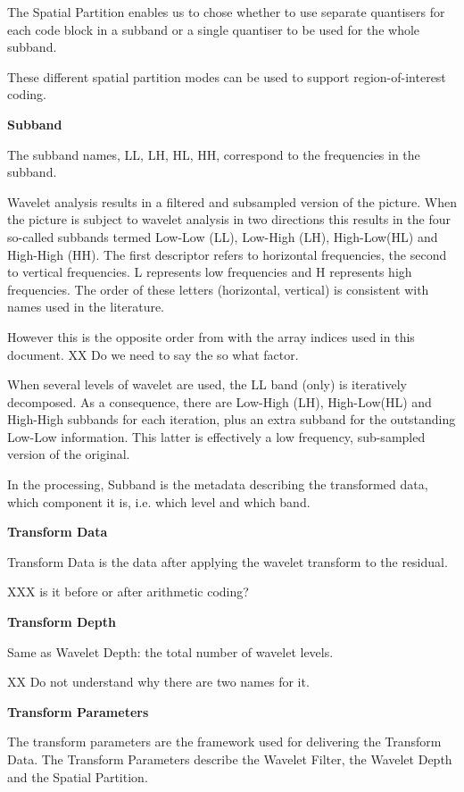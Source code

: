 The Spatial Partition enables us to chose whether to use separate
quantisers for each code block in a subband or a single quantiser to be
used for the whole subband.

These different spatial partition modes can be used to support
region-of-interest coding.



\textbf{Subband}

The subband names, LL, LH, HL, HH, correspond to the frequencies in the
subband.

Wavelet analysis results in a filtered and subsampled version of the
picture. When the picture is subject to wavelet analysis in two
directions this results in the four so-called subbands termed Low-Low
(LL), Low-High (LH), High-Low(HL) and High-High (HH). The first
descriptor refers to horizontal frequencies, the second to vertical
frequencies. L represents low frequencies and H represents high
frequencies. The order of these letters (horizontal, vertical) is
consistent with names used in the literature.

However this is the opposite order from with the array indices used in
this document.  XX Do we need to say the so what factor.

When several levels of wavelet are used, the LL band (only) is
iteratively decomposed. As a consequence, there are Low-High (LH),
High-Low(HL) and High-High subbands for each iteration, plus an extra
subband for the outstanding Low-Low information. This latter is
effectively a low frequency, sub-sampled version of the original.

In the processing, Subband is the metadata describing the transformed
data, which component it is, i.e. which level and which band.

\textbf{Transform Data}

Transform Data is the data after applying the wavelet transform to the
residual.

XXX is it before or after arithmetic coding?

\textbf{Transform Depth}

Same as Wavelet Depth: the total number of wavelet levels.

XX Do not understand why there are two names for it.

\textbf{Transform Parameters}

The transform parameters are the framework used for delivering the
Transform Data. The Transform Parameters describe the Wavelet Filter,
the Wavelet Depth and the Spatial Partition.


